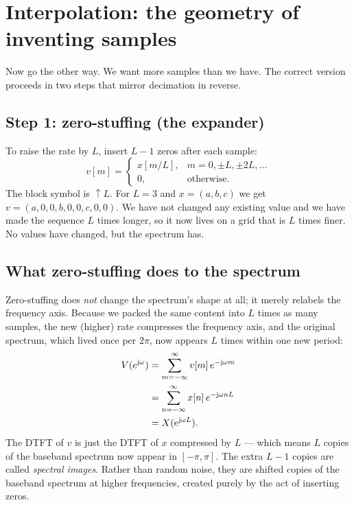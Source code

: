 \section{Interpolation: the geometry of inventing samples}
\label{ch22:interp}

Now go the other way. We want more samples than we have. The correct version
proceeds in two steps that mirror decimation in reverse.

\subsection{Step 1: zero-stuffing (the expander)}

To raise the rate by $L$, insert $L-1$ zeros after each sample:
\begin{equation}
  v[m] =
  \begin{cases}
    x[m/L], & m = 0, \pm L, \pm 2L, \dots\\
    0, & \text{otherwise.}
  \end{cases}
  \label{ch22:expand}
\end{equation}
The block symbol is $\uparrow L$. For $L=3$ and $x = (a, b, c)$ we get
$v = (a, 0, 0, b, 0, 0, c, 0, 0)$. We have not changed any existing value and we
have made the sequence $L$ times longer, so it now lives on a grid that is $L$
times finer. No values have changed, but the spectrum has.

\subsection{What zero-stuffing does to the spectrum}

Zero-stuffing does \emph{not} change the spectrum's shape at all; it merely
relabels the frequency axis. Because we packed the same content into $L$ times as
many samples, the new (higher) rate compresses the frequency axis, and the
original spectrum, which lived once per $2\pi$, now appears $L$ times within one
new period:
\begin{align}
  V(e^{\mathrm{j}\omega}) &= \sum_{m=-\infty}^{\infty} v[m]\,e^{-\mathrm{j}\omega m} \notag \\
  &= \sum_{n=-\infty}^{\infty} x[n]\,e^{-\mathrm{j}\omega n L} \notag \\
  &= X(e^{\mathrm{j}\omega L}).
  \label{ch22:expandspec}
\end{align}
The DTFT of $v$ is just the DTFT of $x$ compressed by $L$ --- which means $L$
copies of the baseband spectrum now appear in $[-\pi, \pi]$. The extra $L-1$
copies are called \emph{spectral images}. Rather than random noise, they are shifted
copies of the baseband spectrum at higher frequencies, created purely by the act
of inserting zeros.


